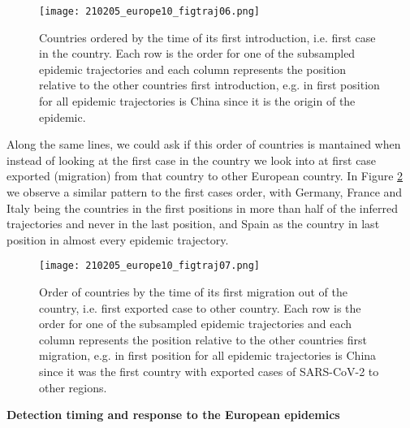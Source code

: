 \begin{figure}[ht]
    \centering
    \texttt{[image: 210205\_europe10\_figtraj06.png]}
    \caption{Countries ordered by the time of its first introduction, i.e. first case in the country. Each row is the order for one of the subsampled epidemic trajectories and each column represents the position relative to the other countries first introduction, e.g. in first position for all epidemic trajectories is China since it is the origin of the epidemic.} 
    \label{fig:first_imig}
\end{figure}

Along the same lines, we could ask if this order of countries is mantained when instead of looking at the first case in the country we look into at first case exported (migration) from that country to other European country. In Figure \ref{fig:first_omig} we observe a similar pattern to the first cases order, with Germany, France and Italy being the countries in the first positions in more than half of the inferred trajectories and never in the last position, and Spain as the country in last position in almost every epidemic trajectory.\\

\begin{figure}[ht]
    \centering
    \texttt{[image: 210205\_europe10\_figtraj07.png]}
    \caption{Order of countries by the time of its first migration out of the country, i.e. first exported case to other country. Each row is the order for one of the subsampled epidemic trajectories and each column represents the position relative to the other countries first migration, e.g. in first position for all epidemic trajectories is China since it was the first country with exported cases of SARS-CoV-2 to other regions.}
    \label{fig:first_omig}
\end{figure}

\textbf{Detection timing and response to the European epidemics}



